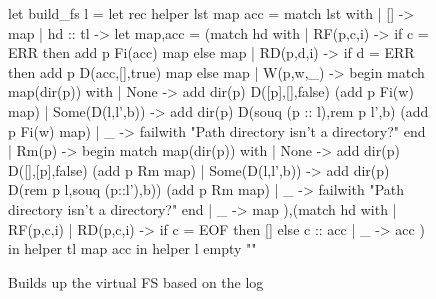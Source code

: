 \begin{comment}
\qqquad \LETIN{(p,i)}{H(\pfds)(fd)} \\
\qqquad \LETIN{index}{\IFTHEN{H(real\_index) = 0 \AND i > 0} ~ i-1 ~ \\
\qqqquad \qqqquad ~ \ELSE H(real\_index)-1} \\
\qqquad \LETIN{ele}{\IFTHEN{d}~ RD(p,v,index) ~ \ELSE RF(p,v,index)} \\
\qqquad \LETIN{H'}{\IFTHEN{v=\ERR}~ H[real\_index := 0] ~ \ELSE H} \\
\qqquad H'[log := ele :: H(log)] \\
\qquad \mid~Write(fd,w) \rightarrow \\
\qqquad \LETIN{(p,i)}{H(\pfds)(fd)} \\
\qqquad H[log := W(p,w,i) :: H(log)] \\
\qquad \mid~Remove(p) \rightarrow H[log := Rm(p) :: H(log)] \\
\qquad \mid~Test(p) \rightarrow H[log := Test(p) :: H(log)] \\
\quad \FIN \\
\quad \LETIN{logFS}{build\_fs (rev H(log))} \\
\quad \LETIN{H'}{H'[logFS := logFS]} \\
\quad (F,H',0)
\end{array}
\end{displaymath}
\end{minipage}
\caption{Transaction Helper Function Semantics}
\end{figure*}
\end{comment}

\begin{figure}
\begin{code}
let build\_fs l =
  let rec helper lst map acc =
  match lst with
    | []       -> map
    | hd :: tl ->
      let map,acc =
      (match hd with
      | RF(p,c,i)  ->
        if c = ERR
        then add p Fi(acc) map
        else map
      | RD(p,d,i)  -> 
        if d = ERR
        then add p D(acc,[],true) map
        else map
      | W(p,w,_)   ->
        begin
        match map(dir(p)) with
        | None            -> 
          add dir(p) D([p],[],false) (add p Fi(w) map)
        | Some(D(l,l',b)) -> 
          add dir(p) D(souq (p :: l),rem p l',b) (add p Fi(w) map)
        | \_              -> 
          failwith "Path directory isn't a directory?"
        end
      | Rm(p)      -> 
        begin
        match map(dir(p)) with
        | None            -> 
          add dir(p) D([],[p],false) (add p Rm map)
        | Some(D(l,l',b)) -> 
          add dir(p) D(rem p l,souq (p::l'),b)) (add p Rm map)
        | \_               -> 
          failwith "Path directory isn't a directory?"
        end
      | \_        -> map
      ),(match hd with
      | RF(p,c,i) 
      | RD(p,c,i)  -> 
        if c = EOF
        then []
        else c :: acc
      | \_        -> acc
      )
      in
      helper tl map acc
  in 
  helper l empty ""
\end{code}
\caption{Builds up the virtual FS based on the log}
\end{figure}

